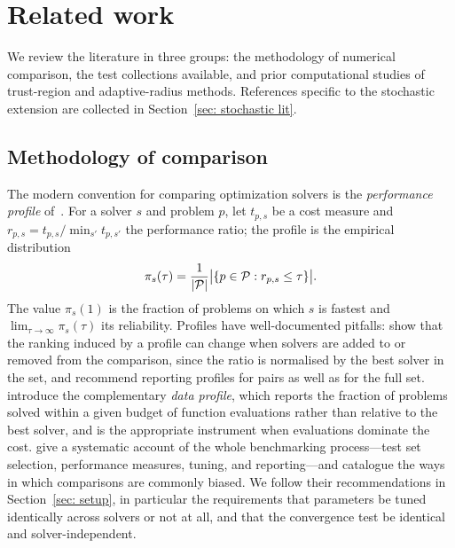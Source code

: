 \documentclass[11pt]{article}
\theoremstyle{plain}
\theoremstyle{definition}
\theoremstyle{remark}
\numberwithin{equation}{section}
\begin{document}
\section{Related work}
\label{sec: related work}

We review the literature in three groups: the methodology of numerical comparison, the test
collections available, and prior computational studies of trust-region and adaptive-radius
methods. References specific to the stochastic extension are collected in
Section~\ref{sec: stochastic lit}.

\subsection{Methodology of comparison}

The modern convention for comparing optimization solvers is the \emph{performance profile}
of~\citet{DolanMore02}. For a solver $s$ and problem $p$, let $t_{p,s}$ be a cost measure and
$r_{p,s} = t_{p,s} / \min_{s'} t_{p,s'}$ the performance ratio; the profile is the empirical
distribution
\begin{equation}
  \pi_s(\tau) = \frac{1}{|{\mathcal{P}}|}
    \bigl| \{ p \in {\mathcal{P}} : r_{p,s} \leq \tau \} \bigr|.
  \label{eqn: performance profile}
\end{equation}
The value $\pi_s(1)$ is the fraction of problems on which $s$ is fastest and
$\lim_{\tau \to \infty}\pi_s(\tau)$ its reliability. Profiles have well-documented pitfalls:
\citet{GouldScott16} show that the ranking induced by a profile can change when solvers are
added to or removed from the comparison, since the ratio is normalised by the best solver in
the set, and recommend reporting profiles for pairs as well as for the full set.
\citet{MoreWild09} introduce the complementary \emph{data profile}, which reports the fraction
of problems solved within a given budget of function evaluations rather than relative to the
best solver, and is the appropriate instrument when evaluations dominate the cost.
\citet{BeiranvandHareLucet17} give a systematic account of the whole benchmarking process---test
set selection, performance measures, tuning, and reporting---and catalogue the ways in which
comparisons are commonly biased. We follow their recommendations in
Section~\ref{sec: setup}, in particular the requirements that parameters be tuned identically
across solvers or not at all, and that the convergence test be identical and solver-independent.
\end{document}
